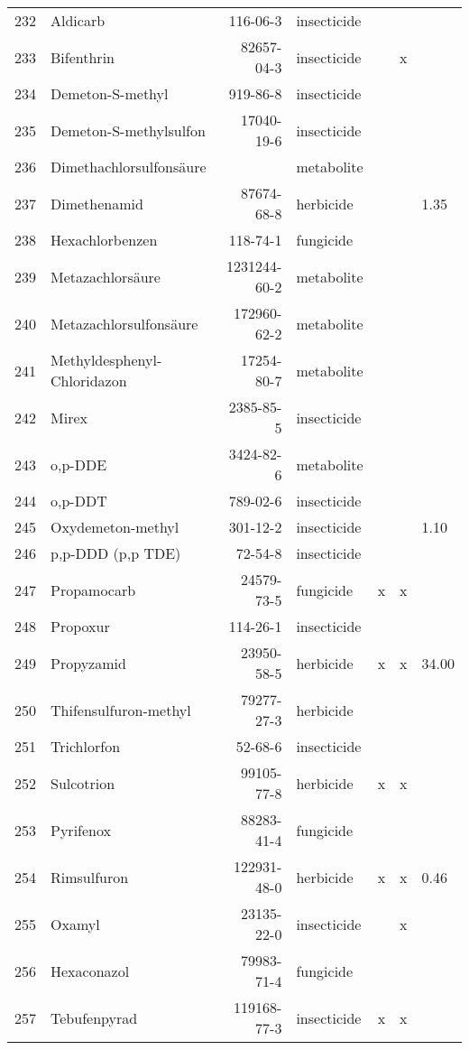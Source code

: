 \begin{longtable}{lp{3cm}rlp{0.5cm}p{0.5cm}p{1cm}}
  232 & Aldicarb & 116-06-3 & insecticide &  &  &  \\ 
  233 & Bifenthrin & 82657-04-3 & insecticide &  & x &  \\ 
  234 & Demeton-S-methyl & 919-86-8 & insecticide &  &  &  \\ 
  235 & Demeton-S-methylsulfon & 17040-19-6 & insecticide &  &  &  \\ 
  236 & Dimethachlorsulfonsäure &  & metabolite &  &  &  \\ 
  237 & Dimethenamid & 87674-68-8 & herbicide &  &  & 1.35 \\ 
  238 & Hexachlorbenzen & 118-74-1 & fungicide &  &  &  \\ 
  239 & Metazachlorsäure & 1231244-60-2 & metabolite &  &  &  \\ 
  240 & Metazachlorsulfonsäure & 172960-62-2 & metabolite &  &  &  \\ 
  241 & Methyldesphenyl-Chloridazon & 17254-80-7 & metabolite &  &  &  \\ 
  242 & Mirex & 2385-85-5 & insecticide &  &  &  \\ 
  243 & o,p-DDE & 3424-82-6 & metabolite &  &  &  \\ 
  244 & o,p-DDT & 789-02-6 & insecticide &  &  &  \\ 
  245 & Oxydemeton-methyl & 301-12-2 & insecticide &  &  & 1.10 \\ 
  246 & p,p-DDD (p,p TDE) & 72-54-8 & insecticide &  &  &  \\ 
  247 & Propamocarb & 24579-73-5 & fungicide & x & x &  \\ 
  248 & Propoxur & 114-26-1 & insecticide &  &  &  \\ 
  249 & Propyzamid & 23950-58-5 & herbicide & x & x & 34.00 \\ 
  250 & Thifensulfuron-methyl & 79277-27-3 & herbicide &  &  &  \\ 
  251 & Trichlorfon & 52-68-6 & insecticide &  &  &  \\ 
  252 & Sulcotrion & 99105-77-8 & herbicide & x & x &  \\ 
  253 & Pyrifenox & 88283-41-4 & fungicide &  &  &  \\ 
  254 & Rimsulfuron & 122931-48-0 & herbicide & x & x & 0.46 \\ 
  255 & Oxamyl & 23135-22-0 & insecticide &  & x &  \\ 
  256 & Hexaconazol & 79983-71-4 & fungicide &  &  &  \\ 
  257 & Tebufenpyrad & 119168-77-3 & insecticide & x & x &  \\ 

\end{longtable}
